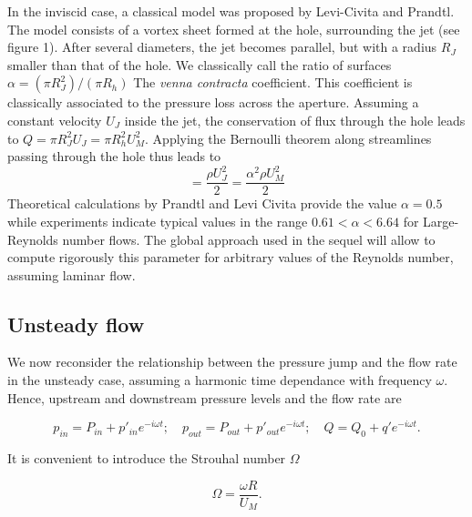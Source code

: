 \documentclass{jfm}
\newcommand\be{\begin{equation}}
\newcommand\ee{\end{equation}}
\begin{document}
In the inviscid case, a classical model was proposed by Levi-Civita and Prandtl. The model consists of a vortex sheet formed at the hole, surrounding the jet (see figure 1). After several diameters, the jet becomes parallel, but with a radius $R_J$ smaller than that of the hole. We classically call the ratio of surfaces $\alpha = (\pi R_J^2)/(\pi R_h)$ The {\em venna contracta} coefficient. This coefficient is classically associated to the pressure loss across the aperture. Assuming a constant velocity $U_J$ inside the jet, the conservation of flux through the hole leads to 
$Q = \pi R_J^2 U_J = \pi R_h^2 U_M^2$. Applying the Bernoulli theorem along streamlines passing through the hole thus leads to 
\be
[P_{in}-P_{out}] = \frac{\rho U_J^2}{2} = \frac{\alpha^2  \rho U_M^2}{2}
\label{eq:alpha}
\ee
Theoretical calculations by Prandtl and Levi Civita provide the value $\alpha = 0.5$ while experiments indicate typical values in the range $0.61< \alpha< 6.64$ for Large-Reynolds number flows. The global approach used in the sequel will allow to compute rigorously this parameter for arbitrary values of the Reynolds number, assuming laminar flow.





\subsection{Unsteady flow}

We now reconsider the relationship between the pressure jump and the flow rate in the unsteady case, assuming a harmonic time dependance with frequency $\omega$. Hence, upstream and downstream pressure levels and the flow rate are 

$$
p_{in} = P_{in} + p'_{in} e^{-i \omega t} ; \quad p_{out} = P_{out} + p'_{out} e^{-i \omega t} ; \quad Q = Q_0 + q' e^{-i \omega t}.
$$

It is convenient to introduce the Strouhal number $\Omega$ 

$$ 
\Omega = \frac{\omega R}{U_M}.
$$
\end{document}
